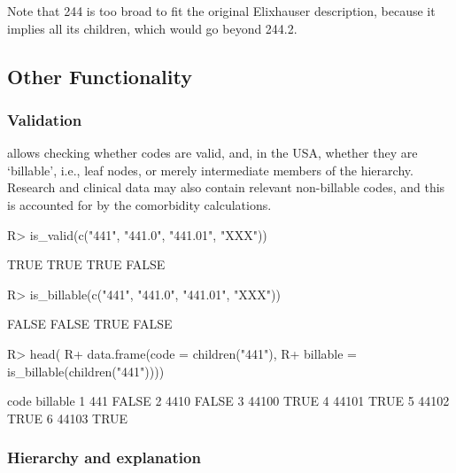 \documentclass[article]{jss}
\begin{document}
Note that 244 is too broad to fit the original Elixhauser description,
because it implies all its children, which would go beyond 244.2.

\subsection{Other Functionality}\label{other-functionality}

\subsubsection{Validation}\label{validation}

 allows checking whether codes are valid, and, in the USA,
whether they are `billable', i.e., leaf nodes, or merely intermediate
members of the hierarchy. Research and clinical data may also contain
relevant non-billable codes, and this is accounted for by the
comorbidity calculations.

\begin{CodeChunk}

\begin{CodeInput}
R> is_valid(c("441", "441.0", "441.01", "XXX"))
\end{CodeInput}

\begin{CodeOutput}
[1]  TRUE  TRUE  TRUE FALSE
\end{CodeOutput}

\begin{CodeInput}
R> is_billable(c("441", "441.0", "441.01", "XXX"))
\end{CodeInput}

\begin{CodeOutput}
[1] FALSE FALSE  TRUE FALSE
\end{CodeOutput}

\begin{CodeInput}
R> head(
R+   data.frame(code = children("441"),
R+              billable = is_billable(children("441"))))
\end{CodeInput}

\begin{CodeOutput}
   code billable
1   441    FALSE
2  4410    FALSE
3 44100     TRUE
4 44101     TRUE
5 44102     TRUE
6 44103     TRUE
\end{CodeOutput}
\end{CodeChunk}

\subsubsection{Hierarchy and
explanation}\label{hierarchy-and-explanation}
\end{document}
